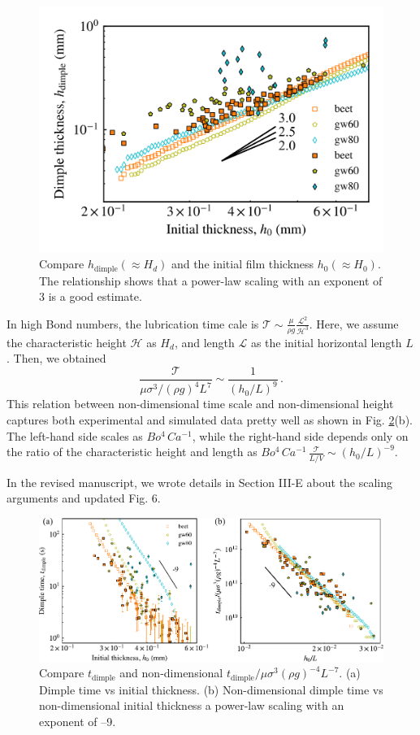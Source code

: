 \documentclass[11pt]{article}
\newif\ifhighlight
\newcommand{\hl}[1]{\ifhighlight\textcolor{blue}{#1}\else#1\fi}
\begin{document}
\begin{figure}[ht]
    \centering
    \includegraphics[width=0.4\linewidth]{Responses/rfigs/hh0.png}
    \caption{Compare $h_\mathrm{dimple} (\approx H_d)$ and the initial film thickness $h_0 (\approx H_0)$. The relationship shows that a power-law scaling with an exponent of 3 is a good estimate. }
    \label{fig:h_h0}
\end{figure}

In high Bond numbers, the lubrication time cale is $\mathcal{T} \sim \frac{\mu}{\rho g} \frac{\mathcal{L}^2}{\mathcal{H}^3}$. Here, we assume the characteristic height $\mathcal{H}$ as $H_d$, and length $\mathcal{L}$ as the initial horizontal length $L$. Then, we obtained 
\begin{equation}
    \frac{\mathcal{T}}{\mu \sigma^3 /(\rho g)^4 L^7} \sim \frac{1}{(h_0/L)^9} \,.
\end{equation} 
This relation between non-dimensional time scale and non-dimensional height captures both experimental and simulated data pretty well as shown in Fig. \ref{fig:to_combine}(b). 
The left-hand side scales as $Bo^4 \, Ca^{-1}$, while the right-hand side depends only on the ratio of the characteristic height and length as 
$Bo^4 \, Ca^{-1} \, \frac{\mathcal{T}}{L/V } \sim (h_0/L)^{-9}$. 

\hl{
In the revised manuscript, we wrote details in Section III-E about the scaling arguments and updated Fig. 6. 
}

\begin{figure}[h]
    \centering
    \includegraphics[width=0.8\linewidth]{good_collapse}
    \caption{Compare $t_\mathrm{dimple}$ and non-dimensional $t_\mathrm{dimple}/{\mu \sigma^3 (\rho g)^{-4} L^{-7}}$. (a) Dimple time vs initial thickness. (b) Non-dimensional dimple time vs non-dimensional initial thickness a power-law scaling with an exponent of –9. }
    \label{fig:to_combine}
\end{figure}
\end{document}
